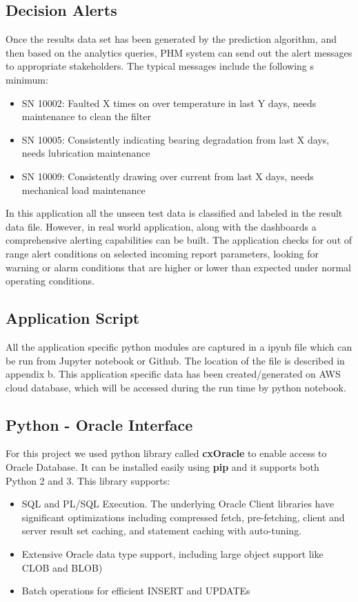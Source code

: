 \documentclass[sigconf]{acmart}
\begin{document}
\subsection{Decision Alerts}
Once the results data set has been generated by the prediction algorithm, and then based on the analytics queries, PHM system can send out the alert messages to appropriate stakeholders. The typical messages include the following s minimum:
\begin{itemize}
  \item SN 10002: Faulted X times on over temperature in last Y days, needs maintenance to clean the filter
  \item SN 10005: Consistently indicating bearing degradation from last X days, needs lubrication maintenance
\item SN 10009: Consistently drawing over current from last X days, needs mechanical load maintenance
\end{itemize}

In this application all the unseen test data is classified and labeled in the result data file. However, in real world application, along with the dashboards a comprehensive alerting capabilities can be built. The application checks for out of range alert conditions on selected incoming report parameters, looking for warning or alarm conditions that are higher or lower than expected under normal operating conditions.

\subsection{Application Script}
All the application specific python modules are captured in a ipynb file which can be run from Jupyter notebook or Github. The location of the file is described in appendix b. This application specific data has been created/generated on AWS cloud database, which will be accessed during the run time by python notebook.

\subsection{Python - Oracle Interface}
For this project we used python library called \textbf{cxOracle} \cite{OracleOTN} to enable access to Oracle Database. It can be installed easily using \textbf{pip} and it supports both Python 2 and 3. This library supports:
\begin{itemize}
  \item SQL and PL/SQL Execution. The underlying Oracle Client libraries have significant optimizations including compressed fetch, pre-fetching, client and server result set caching, and statement caching with auto-tuning.
  \item Extensive Oracle data type support, including large object support like CLOB and BLOB)
  \item Batch operations for efficient INSERT and UPDATEs
\end{itemize}
\end{document}
